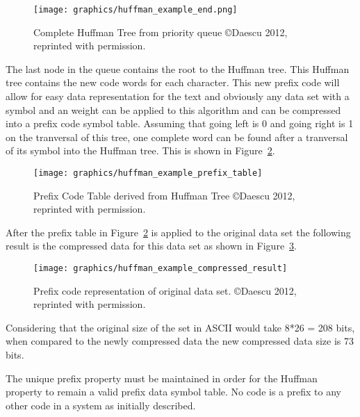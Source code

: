 \documentclass[letterpaper, 11pt]{article}
\begin{document}
\begin{figure}
  \centering
  \texttt{[image: graphics/huffman\_example\_end.png]}
  \caption{Complete Huffman Tree from priority queue  \copyright Daescu 2012, reprinted with permission.\cite{huffman}}
  \label{fig:huffman_full_tree}
\end{figure}

The last node in the queue contains the root to the Huffman tree. This Huffman tree
contains the new code words for each character. This new prefix code will allow for easy
data representation for the text and obviously any data set with a symbol and an weight can
be applied to this algorithm and can be compressed into a prefix code symbol table.
Assuming that going left is 0 and going right is 1 on the tranversal of this tree, one complete
word can be found after a tranversal of its symbol into the Huffman tree. This is shown in
Figure~\ref{fig:huffman_prefix_table}.
\par\vspace{\baselineskip}

\begin{figure}
  \centering
  \texttt{[image: graphics/huffman\_example\_prefix\_table]}
  \caption{Prefix Code Table derived from Huffman Tree  \copyright Daescu 2012, reprinted with permission.\cite{huffman}}
  \label{fig:huffman_prefix_table}
\end{figure}

\par\vspace{\baselineskip}
After the prefix table in Figure~\ref{fig:huffman_prefix_table} is applied to the original data set the following result is the compressed
data for this data set as shown in Figure~\ref{fig:huffman_compressed}.
\par\vspace{\baselineskip}
\begin{figure}
  \centering
  \texttt{[image: graphics/huffman\_example\_compressed\_result]}
  \caption{Prefix code representation of original data set.  \copyright Daescu 2012, reprinted with permission.\cite{huffman}}
  \label{fig:huffman_compressed}
\end{figure}

Considering that the original size of the set in ASCII would take 8*26 = 208 bits, when compared to
the newly compressed data the new compressed data size is 73 bits.
\par\vspace{\baselineskip}
The unique prefix property must be maintained in order for the Huffman property to remain a valid prefix
data symbol table. No code is a prefix to any other code in a system as initially described.
\par\vspace{\baselineskip}
\end{document}
